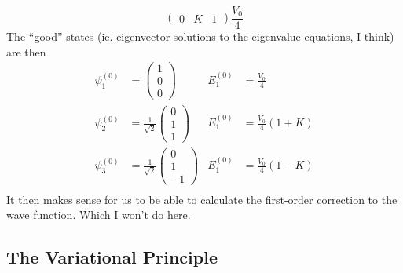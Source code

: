 \documentclass[a4paper]{article}
\begin{document}
\begin{eg}
\[\begin{pmatrix}
		0 & K & 1
	\end{pmatrix}
	\frac{V_0}{4}
	\]
	The ``good'' states (ie. eigenvector solutions to the eigenvalue
	equations, I think) are then
	\begin{align*}
		\psi_1^{(0)} &= 
			\begin{pmatrix}1\\0\\0\end{pmatrix}&
			E_1^{(0)} &= \frac{V_0}{4}\\
		\psi_2^{(0)} &=
			\frac{1}{\sqrt{2}}\begin{pmatrix}0\\1\\1\end{pmatrix}&
			E_1^{(0)} &= \frac{V_0}{4}(1+K)\\
		\psi_3^{(0)} &=
			\frac{1}{\sqrt{2}}\begin{pmatrix}0\\1\\-1\end{pmatrix}&
			E_1^{(0)} &= \frac{V_0}{4}(1-K)\\
	\end{align*}
	It then makes sense for us to be able to calculate the first-order
	correction to the wave function. Which I won't do here.
\end{eg}


\subsection{The Variational Principle}
\end{document}
